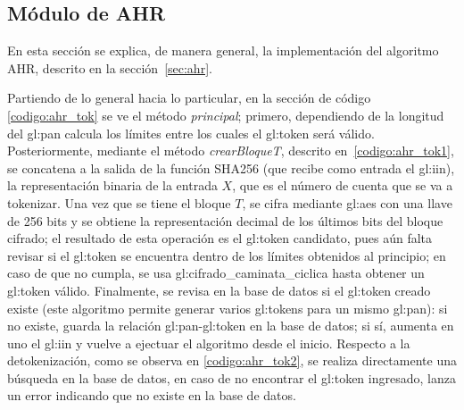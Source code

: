 %
%
%

\subsection{Módulo de AHR}

En esta sección se explica, de manera general, la implementación del algoritmo
AHR, descrito en la sección~\ref{sec:ahr}.

Partiendo de lo general hacia lo particular, en la sección de código
\ref{codigo:ahr_tok} se ve el método \textit{principal}; primero, dependiendo de
la longitud del \gls{gl:pan} calcula los límites entre los cuales el
\gls{gl:token} será válido. Posteriormente, mediante el método
\textit{crearBloqueT}, descrito en~\ref{codigo:ahr_tok1}, se concatena a la
salida de la función SHA256 (que recibe como entrada el \gls{gl:iin}), la
representación binaria de la entrada $X$, que es el número de cuenta que se
va a tokenizar. Una vez que se tiene el bloque $T$, se cifra mediante
\gls{gl:aes} con una llave de 256 bits y se obtiene la representación decimal
de los últimos bits del bloque cifrado; el resultado de esta operación es
el \gls{gl:token} candidato, pues aún falta revisar si el \gls{gl:token} se
encuentra dentro de los límites obtenidos al principio; en caso de que no
cumpla, se usa \gls{gl:cifrado_caminata_ciclica} hasta obtener un \gls{gl:token}
válido. Finalmente, se revisa en la base de datos si el \gls{gl:token} creado
existe (este algoritmo permite generar varios \glspl{gl:token} para un mismo
\gls{gl:pan}): si no existe, guarda la relación \gls{gl:pan}-\gls{gl:token} en
la base de datos; si sí, aumenta en uno el \gls{gl:iin} y vuelve a ejectuar
el algoritmo desde el inicio. Respecto a la detokenización, como se observa en
\ref{codigo:ahr_tok2}, se realiza directamente una búsqueda en la base de datos,
en caso de no encontrar el \gls{gl:token} ingresado, lanza un error indicando
que no existe en la base de datos.



